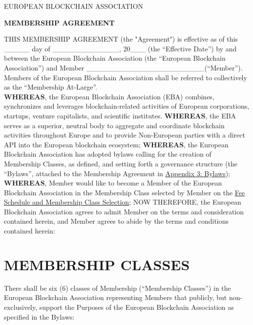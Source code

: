 \documentclass{article}
\begin{document}
{\scshape\LARGE EUROPEAN BLOCKCHAIN ASSOCIATION \centering \par}
\vspace{0.4cm}
{\huge\bfseries MEMBERSHIP AGREEMENT \centering \par}
\vspace{0.8cm}


THIS MEMBERSHIP AGREEMENT (the "Agreement") is effective as of this \_\_\_\_\_
day of \_\_\_\_\_\_\_\_\_\_\_\_\_, 20\_\_\_ (the “Effective Date”) by and between the European Blockchain Association (the “European Blockchain Association”) and Member \_\_\_\_\_\_\_\_\_\_\_\_\_\_\_\_\_\_\_\_\_\_\_(“Member”). Members of the European Blockchain Association shall be referred to collectively as the “Membership At-Large”. \\
\textbf{WHEREAS}, the European Blockchain Association (EBA) combines, synchronizes and leverages blockchain-related activities of European corporations, startups, venture capitalists, and scientific institutes. 
\textbf{WHEREAS}, the EBA serves as a superior, neutral body to aggregate and coordinate blockchain activities throughout Europe and to provide Non-European parties with a direct API into the European blockchain ecosystem;
\textbf{WHEREAS}, the European Blockchain Association has adopted bylaws calling for the creation of Membership Classes, as defined, and setting forth a governance structure (the “Bylaws”, attached to the Membership Agreement in \underline{Appendix 3: Bylaws});
\textbf{WHEREAS}, Member would like to become a Member of the European Blockchain Association in the Membership Class selected by Member on the \underline{Fee Schedule and Membership Class Selection};
NOW THEREFORE, the European Blockchain Association agrees to admit Member on the terms and consideration contained herein, and Member agrees to abide by the terms and conditions contained herein:

\section{MEMBERSHIP CLASSES}
	There shall be six (6) classes of Membership (“Membership Classes”) in the European Blockchain Association representing Members that publicly, but non-exclusively, support the Purposes of the European Blockchain Association as specified in the Bylaws:
	
\end{document}
